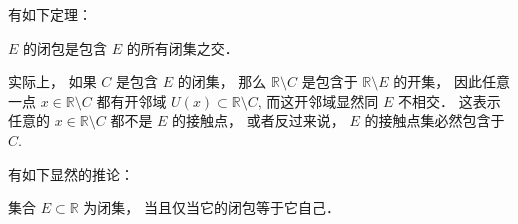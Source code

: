 有如下定理：

\begin{theorem}{}
$E$ 的闭包是包含 $E$ 的所有闭集之交．
\end{theorem}
实际上， 如果 $C$ 是包含 $E$ 的闭集， 那么 $\mathbb{R}\setminus C$ 是包含于 $\mathbb{R}\setminus E$ 的开集， 因此任意一点 $x\in\mathbb{R}\setminus C$ 都有开邻域 $U(x)\subset\mathbb{R}\setminus C$, 而这开邻域显然同 $E$ 不相交． 这表示任意的 $x\in\mathbb{R}\setminus C$ 都不是 $E$ 的接触点， 或者反过来说， $E$ 的接触点集必然包含于 $C$. 

有如下显然的推论：
\begin{corollary}{}
集合 $E\subset\mathbb{R}$ 为闭集， 当且仅当它的闭包等于它自己．
\end{corollary}
